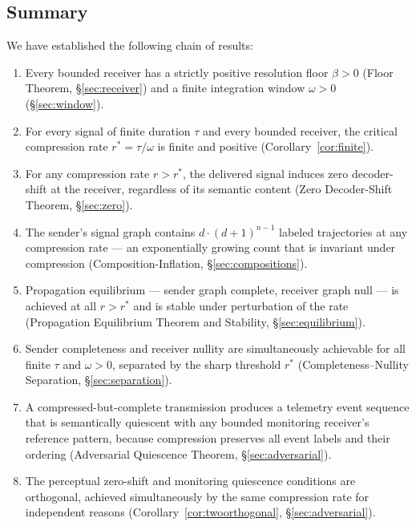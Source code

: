 \documentclass[twocolumn,11pt,a4paper]{article}
\theoremstyle{main}
\theoremstyle{definition}
\theoremstyle{remark}
\newcommand{\floor}{\beta}
\newcommand{\rate}{r}
\newcommand{\window}{\omega}
\begin{document}
\subsection{Summary}

We have established the following chain of results:

\begin{enumerate}[label=(\arabic*), leftmargin=1.8em, itemsep=2pt]
\item Every bounded receiver has a strictly positive resolution floor
  $\floor > 0$ (Floor Theorem, \S\ref{sec:receiver}) and a finite
  integration window $\window > 0$ (\S\ref{sec:window}).

\item For every signal of finite duration $\tau$ and every bounded
  receiver, the critical compression rate $\rate^* = \tau/\window$ is
  finite and positive (Corollary~\ref{cor:finite}).

\item For any compression rate $\rate > \rate^*$, the delivered signal
  induces zero decoder-shift at the receiver, regardless of its semantic
  content (Zero Decoder-Shift Theorem, \S\ref{sec:zero}).

\item The sender's signal graph contains $d \cdot (d+1)^{n-1}$ labeled
  trajectories at any compression rate --- an exponentially growing count
  that is invariant under compression (Composition-Inflation,
  \S\ref{sec:compositions}).

\item Propagation equilibrium --- sender graph complete, receiver graph
  null --- is achieved at all $\rate > \rate^*$ and is stable under
  perturbation of the rate (Propagation Equilibrium Theorem and
  Stability, \S\ref{sec:equilibrium}).

\item Sender completeness and receiver nullity are simultaneously
  achievable for all finite $\tau$ and $\window > 0$, separated by
  the sharp threshold $\rate^*$ (Completeness--Nullity Separation,
  \S\ref{sec:separation}).

\item A compressed-but-complete transmission produces a telemetry
  event sequence that is semantically quiescent with any bounded
  monitoring receiver's reference pattern, because compression
  preserves all event labels and their ordering
  (Adversarial Quiescence Theorem, \S\ref{sec:adversarial}).

\item The perceptual zero-shift and monitoring quiescence conditions
  are orthogonal, achieved simultaneously by the same compression
  rate for independent reasons
  (Corollary~\ref{cor:twoorthogonal}, \S\ref{sec:adversarial}).
\end{enumerate}
\end{document}
